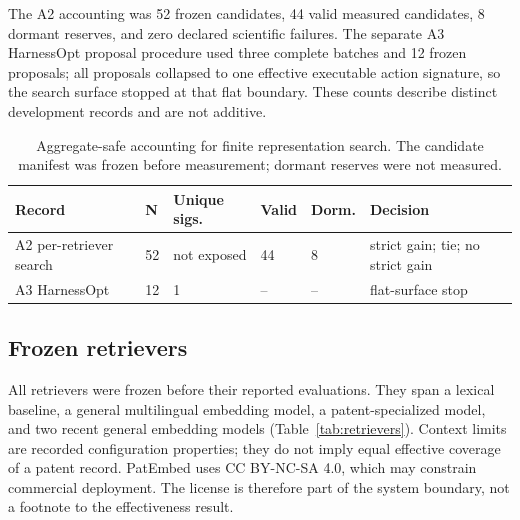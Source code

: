 \documentclass[final,5p,times,twocolumn]{elsarticle}
\newenvironment{widejournal}{\begin{table}[!t]}{\end{table}}
\newcommand{\journalTableFont}{\footnotesize}
\newenvironment{widejournal}{\begin{table}[!htbp]}{\end{table}}
\newcommand{\journalTableFont}{\footnotesize}
\begin{document}
The A2 accounting was 52 frozen candidates, 44 valid measured candidates, 8
dormant reserves, and zero declared scientific failures. The separate A3
HarnessOpt proposal procedure used three complete batches and 12 frozen proposals; all
proposals collapsed to one effective executable action signature, so the
search surface stopped at that flat boundary. These counts describe distinct
development records and are not additive.

\begin{widejournal}
\caption{Aggregate-safe accounting for finite representation search. The
candidate manifest was frozen before measurement; dormant reserves were not
measured.}
\label{tab:search-accounting}
\centering
\journalTableFont
\scriptsize
\setlength{\tabcolsep}{2pt}
\sloppy
\begin{tabularx}{\textwidth}{@{}P{2.8cm}P{1.0cm}P{1.9cm}P{1.5cm}P{1.1cm}Y@{}}
\toprule
Record & N & Unique sigs. & Valid & Dorm. & Decision \\
\midrule
A2 per-retriever search & 52 & not exposed & 44 & 8 & strict gain; tie; no strict gain \\
A3 HarnessOpt & 12 & 1 & -- & -- & flat-surface stop \\
\bottomrule
\end{tabularx}
\end{widejournal}

\subsection{Frozen retrievers}

All retrievers were frozen before their reported evaluations. They span a lexical
baseline, a general multilingual embedding model, a patent-specialized model,
and two recent general embedding models (Table~\ref{tab:retrievers}). Context limits
are recorded configuration properties; they do not imply equal effective
coverage of a patent record. PatEmbed uses CC BY-NC-SA 4.0, which may constrain
commercial deployment. The license is therefore part of the system boundary,
not a footnote to the effectiveness result.
\end{document}
